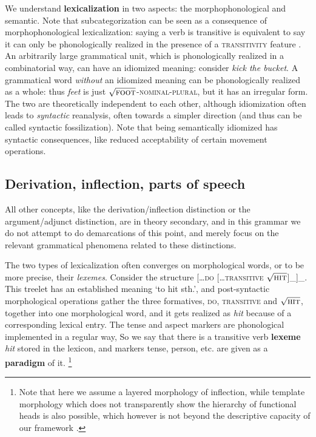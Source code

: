 \documentclass[UTF8, a4paper, oneside, scheme=plain, 12pt]{ctexrep}
\newcommand*{\concept}[1]{\textbf{#1}}
\newcommand{\form}[1]{\emph{#1}}
\newcommand{\translate}[1]{`#1'}
\newcommand*{\category}[1]{\textsc{#1}}
\newcommand*{\wordroot}[1]{$\sqrt{\text{\textsc{#1}}}$}
\begin{document}
{We understand \concept{lexicalization} in two aspects:
the morphophonological and semantic.
Note that subcategorization can be seen as a consequence of morphophonological lexicalization:
saying a verb is transitive is equivalent to say it can only be phonologically realized
in the presence of a \category{transitivity} feature \citep{siddiqi2009syntax}.
An arbitrarily large grammatical unit,
which is phonologically realized in a combinatorial way, can have an idiomized meaning:
consider \form{kick the bucket}.
A grammatical word \emph{without} an idiomized meaning
can be phonologically realized as a whole:
thus \form{feet} is just \wordroot{foot}-\category{nominal}-\category{plural},
but it has an irregular form.
The two are theoretically independent to each other,
although idiomization often leads to \emph{syntactic} reanalysis,
often towards a simpler direction (and thus can be called syntactic fossilization). 
Note that being semantically idiomized has syntactic consequences,
like reduced acceptability of certain movement operations.

\subsection{Derivation, inflection, parts of speech}\label{sec:intro.theory.pos}

All other concepts, like the derivation/inflection distinction
or the argument/adjunct distinction, are in theory secondary,
and in this grammar we do not attempt to do demarcations of this point,
and merely focus on the relevant grammatical phenomena related to these distinctions.

The two types of lexicalization often converges on morphological words,
or to be more precise, their \emph{lexemes}.
Consider the structure [\dots \category{do} [\dots \category{transitive} \wordroot{hit}]_{}]_{}.
This treelet has an established meaning \translate{to hit sth.},
and post-syntactic morphological operations gather the three formatives,
\category{do}, \category{transitive} and \wordroot{hit}, together into one morphological word,
and it gets realized as \form{hit} because of a corresponding lexical entry.
The tense and aspect markers are phonological implemented in a regular way,
So we say that there is a transitive verb \concept{lexeme} \form{hit} stored in the lexicon,
and markers tense, person, etc. are given as a \concept{paradigm} of it.%
\footnote{
    Note that here we assume a layered morphology of inflection,
    while template morphology which does not transparently show the hierarchy of functional heads
    is also possible, which however is not beyond the descriptive capacity of our framework
    \citep{bye2020morpheme}.
}

}
\end{document}
